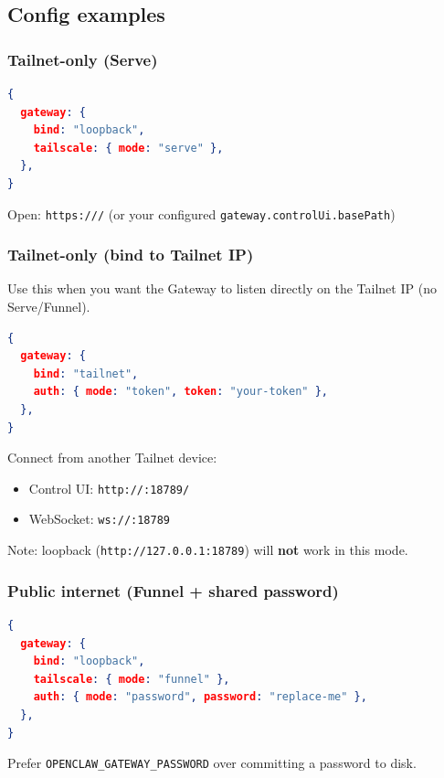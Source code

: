 \subsection{Config examples}


\subsubsection{Tailnet-only (Serve)}


\begin{lstlisting}[language=json]
{
  gateway: {
    bind: "loopback",
    tailscale: { mode: "serve" },
  },
}
\end{lstlisting}


Open: \texttt{https:///} (or your configured \texttt{gateway.controlUi.basePath})

\subsubsection{Tailnet-only (bind to Tailnet IP)}


Use this when you want the Gateway to listen directly on the Tailnet IP (no Serve/Funnel).

\begin{lstlisting}[language=json]
{
  gateway: {
    bind: "tailnet",
    auth: { mode: "token", token: "your-token" },
  },
}
\end{lstlisting}


Connect from another Tailnet device:

\begin{itemize}
  \item Control UI: \texttt{http://:18789/}
  \item WebSocket: \texttt{ws://:18789}
\end{itemize}


Note: loopback (\texttt{http://127.0.0.1:18789}) will \textbf{not} work in this mode.

\subsubsection{Public internet (Funnel + shared password)}


\begin{lstlisting}[language=json]
{
  gateway: {
    bind: "loopback",
    tailscale: { mode: "funnel" },
    auth: { mode: "password", password: "replace-me" },
  },
}
\end{lstlisting}


Prefer \texttt{OPENCLAW\_GATEWAY\_PASSWORD} over committing a password to disk.


